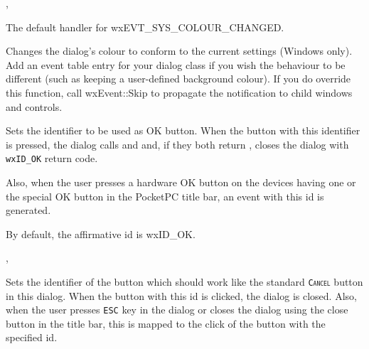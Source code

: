 
, 


\label{wxdialogonsyscolourchanged}


The default handler for wxEVT\_SYS\_COLOUR\_CHANGED.




Changes the dialog's colour to conform to the current settings (Windows only).
Add an event table entry for your dialog class if you wish the behaviour
to be different (such as keeping a user-defined
background colour). If you do override this function, call wxEvent::Skip to
propagate the notification to child windows and controls.




\label{wxdialogsetaffirmativeid}


Sets the identifier to be used as OK button. When the button with this
identifier is pressed, the dialog calls  
and  
and, if they both return \true, closes the dialog with \texttt{wxID\_OK} return
code.

Also, when the user presses a hardware OK button on the devices having one or
the special OK button in the PocketPC title bar, an event with this id is
generated.

By default, the affirmative id is wxID\_OK.


, 


\label{wxdialogsetescapeid}


Sets the identifier of the button which should work like the standard 
\texttt{\textsc{Cancel}} button in this dialog. When the button with this id is
clicked, the dialog is closed. Also, when the user presses \texttt{\textsc{ESC}} 
key in the dialog or closes the dialog using the close button in the title bar,
this is mapped to the click of the button with the specified id.

